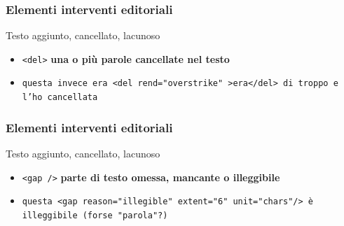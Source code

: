 \begin{frame}
    \frametitle{Elementi interventi editoriali}
    \addtocounter{nframe}{1}
    

    \begin{block}{Testo aggiunto, cancellato, lacunoso}
        \begin{itemize}
            \item \texttt{<del>} \textbf{una o più parole cancellate nel testo}
            \item[] \texttt{questa invece era <del rend="overstrike" >era</del> di troppo e l’ho cancellata}
        \end{itemize}
        
    \end{block}
    
\end{frame}


\begin{frame}
    \frametitle{Elementi interventi editoriali}
    \addtocounter{nframe}{1}
    

    \begin{block}{Testo aggiunto, cancellato, lacunoso}
        \begin{itemize}
            \item \texttt{<gap />} \textbf{parte di testo omessa, mancante o illeggibile}
            \item[] \texttt{questa <gap reason="illegible" extent="6" unit="chars"/> è illeggibile (forse "parola"?)}
        \end{itemize}
        
    \end{block}
    
\end{frame}



